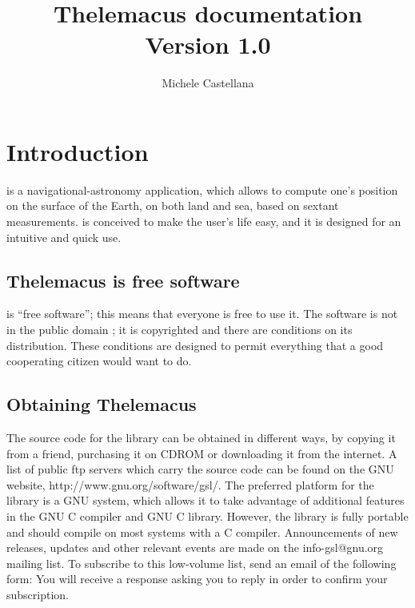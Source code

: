 \documentclass[]{book}
\title{Thelemacus documentation\\
\large{Version 1.0}}
\author{Michele Castellana}
\begin{document}
 

\maketitle 

\pagebreak
\tableofcontents

\chapter{Introduction}

\thel  is a navigational-astronomy application, which allows to compute one's position on the surface of the Earth, on both land and sea, based on sextant measurements. \thel is conceived to make the user's life easy, and it is designed for an intuitive and quick use. 

\section{Thelemacus is free software}

\thel is ``free software''; this means that everyone is free to use it. The software is not in the public domain \cite{castellana2024thelemacus}; it is copyrighted and there are conditions on its distribution. These conditions are designed to permit everything that a good cooperating citizen would want to do.

\section{Obtaining Thelemacus}

The source code for the library can be obtained in different ways, by copying it from a friend, purchasing it on CDROM or downloading it from the internet. A list of public ftp servers which carry the source code can be found on the GNU website, http://www.gnu.org/software/gsl/.
The preferred platform for the library is a GNU system, which allows it to take advantage of additional features in the GNU C compiler and GNU C library. However, the library is fully portable and should compile on most systems with a C compiler.
Announcements of new releases, updates and other relevant events are made on the info-gsl@gnu.org mailing list. To subscribe to this low-volume list, send an email of the following form:
You will receive a response asking you to reply in order to confirm your subscription.
\end{document}
